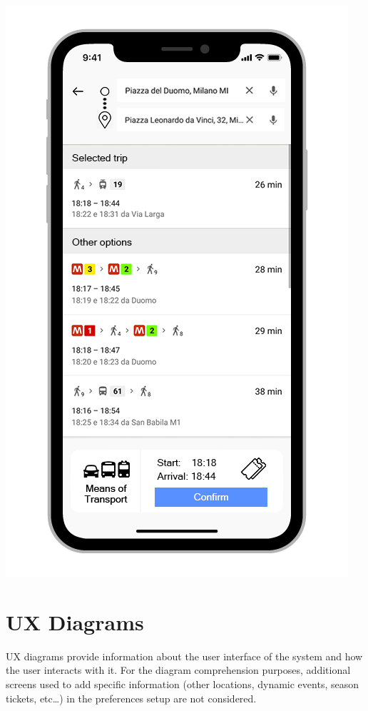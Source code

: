 \begin{center}
\includegraphics[scale=2.4]{MainMatter/images/ui/customized}

\end{center}
%
%
%
%
\section{UX Diagrams}
UX diagrams provide information about the user interface of the system and how the user interacts with it.
For the diagram comprehension purposes, additional screens used to add specific information (other locations, dynamic events, season tickets, etc…) in the preferences setup are not considered.
%
%
%
%
